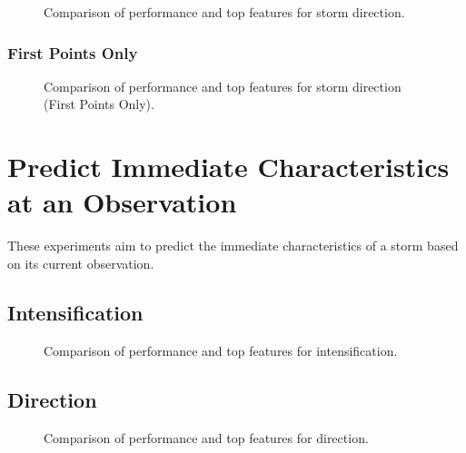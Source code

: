 \begin{figure}[h]
    \centering
    \caption{Comparison of performance and top features for storm direction.}
    \label{fig:storm_direction_summary}
\end{figure}

\subsubsection{First Points Only}

\begin{figure}[h]
    \centering
    \caption{Comparison of performance and top features for storm direction (First Points Only).}
    \label{fig:storm_direction_first_points_summary}
\end{figure}

\section{Predict Immediate Characteristics at an Observation}

These experiments aim to predict the immediate characteristics of a storm based on its current observation.

\subsection{Intensification}

\begin{figure}[h]
    \centering
    \caption{Comparison of performance and top features for intensification.}
    \label{fig:obs_intensification_summary}
\end{figure}

\subsection{Direction}

\begin{figure}[h]
    \centering
    \caption{Comparison of performance and top features for direction.}
    \label{fig:obs_direction_summary}
\end{figure}

